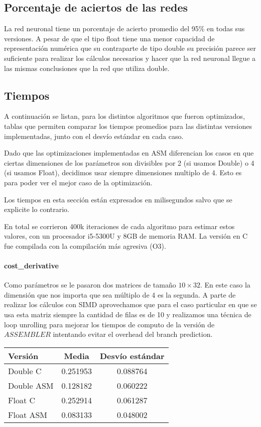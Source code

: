 \subsection{Porcentaje de aciertos de las redes}

La red neuronal tiene un porcentaje de acierto promedio del 95\% en todas sus versiones. A pesar de que el tipo float tiene una menor capacidad de representación numérica que su contraparte de tipo double su precisión parece ser suficiente para realizar los cálculos necesarios y hacer que la red neuronal llegue a las mismas conclusiones que la red que utiliza double.

\subsection{Tiempos}

A continuación se listan, para los distintos algoritmos que fueron optimizados, tablas que permiten comparar los tiempos promedios para las distintas versiones implementadas, junto con el desvío estándar en cada caso.

Dado que las optimizaciones implementadas en ASM diferencian los casos en que ciertas dimensiones de los parámetros son divisibles por 2 (si usamos Double) o 4 (si usamos Float), decidimos usar siempre dimensiones multiplo de 4. Esto es para poder ver el mejor caso de la optimización.

Los tiempos en esta sección están expresados en milisegundos salvo que se explicite lo contrario.

En total se corrieron 400k iteraciones de cada algoritmo para estimar estos valores, con un procesador i5-5300U y 8GB de memoria RAM. La versión en C fue compilada con la compilación más agresiva (O3).

\paragraph{cost\_derivative}

Como parámetros se le pasaron dos matrices de tamaño $10\times32$. En este caso la dimensión que nos importa que sea múltiplo de 4 es la segunda. A parte de realizar los cálculos con SIMD aprovechamos que para el caso particular en que se usa esta matriz siempre la cantidad de filas es de 10 y realizamos una técnica de loop unrolling para mejorar los tiempos de computo de la versión de $ASSEMBLER$ intentando evitar el overhead del branch prediction.

\begin{center}
    \begin{tabular}{| l | c | c |}
                \hline
    Versión & Media & Desvío estándar \\
                \hline
    Double C & 0.251953 & 0.088764 \\
    Double ASM & 0.128182 & 0.060222 \\
    Float C & 0.252914 & 0.061287 \\
    Float ASM  & 0.083133 & 0.048002 \\
                \hline
			
        \end{tabular}
\end{center}

